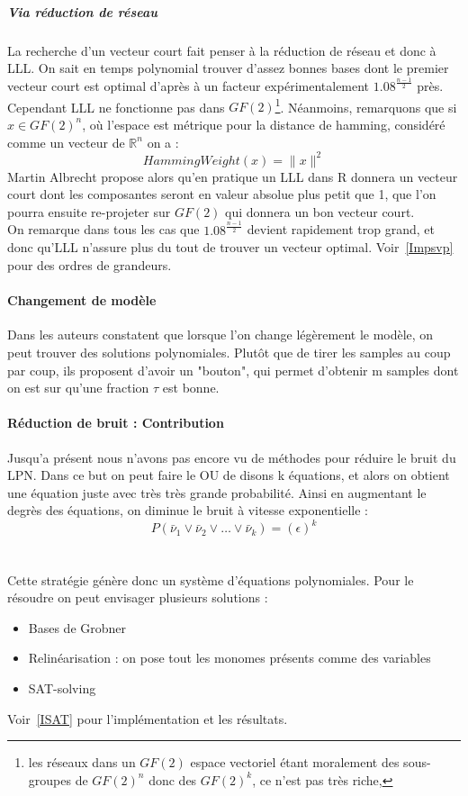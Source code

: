 \documentclass{article}		%
\theoremstyle{definition}
\theoremstyle{plain}
\begin{document}
\subparagraph{Via réduction de réseau} 
La recherche d'un vecteur court fait penser à la réduction de réseau et
donc à LLL. On sait en temps polynomial trouver d'assez bonnes bases dont
le premier vecteur court est optimal d'après \cite{Phong} à un facteur expérimentalement
$1.08^{\frac {n-1} 2}$ près.
Cependant LLL ne fonctionne pas dans $GF(2)$\footnote{les réseaux dans un
$GF(2)$ espace vectoriel étant moralement des sous-groupes de $GF(2)^n$
donc des $GF(2)^k$, ce n'est pas très riche, }. Néanmoins, remarquons que
si 
 $x\in GF(2)^n$, où l'espace est métrique pour la distance de hamming, considéré comme un vecteur de $\mathbb{R}^n$ on a :
$$HammingWeight(x)=\| x \| ^2$$  
 Martin Albrecht propose alors qu'en pratique un LLL dans R donnera un
vecteur court dont les composantes seront en valeur absolue plus petit
que 1, que l'on pourra ensuite re-projeter sur $GF(2)$ qui donnera un bon
vecteur court.
\\
On remarque dans tous les cas que $1.08^{\frac {n-1} {2}}$ devient
rapidement trop grand, et donc qu'LLL n'assure plus du tout de trouver un
vecteur optimal. Voir~\ref{Impsvp} pour des ordres de grandeurs.

\paragraph{Changement de modèle} Dans \cite{Arora} les auteurs constatent
que lorsque l'on change légèrement le modèle, on peut trouver des
solutions polynomiales. Plutôt que de tirer les samples au coup par coup,
ils proposent d'avoir un "bouton", qui permet d'obtenir m samples dont on
est sur qu'une fraction $\tau$ est bonne.
\paragraph{Réduction de bruit : Contribution} \label{SAT} 
Jusqu'a présent nous n'avons pas encore vu de méthodes pour réduire le
bruit du LPN. Dans ce but on peut faire le OU de disons k équations, et
alors on obtient une équation juste avec très très grande probabilité.
Ainsi en augmentant le degrès des équations, on diminue le bruit à
vitesse exponentielle :
 $$P(\bar\nu_1 \vee \bar\nu_2 \vee \dots \vee \bar\nu_k)=(\epsilon)^k$$
\\\\
Cette stratégie génère donc un système d'équations polynomiales. Pour le
résoudre on peut envisager plusieurs solutions :
\begin{itemize}
\item Bases de Grobner
\item Relinéarisation : on pose tout les monomes présents comme des
variables
\item SAT-solving
\end{itemize}
Voir~\ref{ISAT} pour l'implémentation et les résultats.
\end{document}
